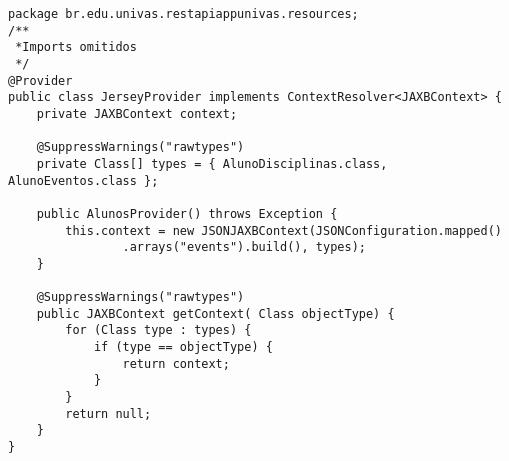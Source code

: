 \begin{lstlisting}[style=custom_JAVA]
package br.edu.univas.restapiappunivas.resources;
/**
 *Imports omitidos
 */
@Provider
public class JerseyProvider implements ContextResolver<JAXBContext> {
	private JAXBContext context;

	@SuppressWarnings("rawtypes")
	private Class[] types = { AlunoDisciplinas.class, AlunoEventos.class };

	public AlunosProvider() throws Exception {
		this.context = new JSONJAXBContext(JSONConfiguration.mapped()
				.arrays("events").build(), types);
	}

	@SuppressWarnings("rawtypes")
	public JAXBContext getContext( Class objectType) {
		for (Class type : types) {
			if (type == objectType) {
				return context;
			}
		}
		return null;
	}
}
\end{lstlisting}